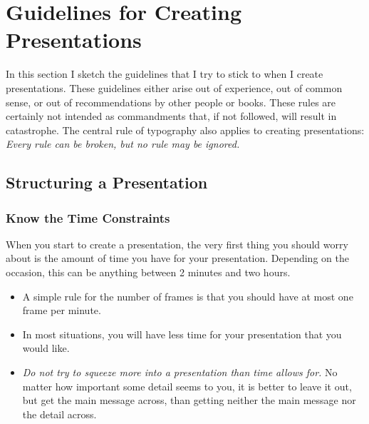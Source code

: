 
%

\section{Guidelines for Creating Presentations}


\label{section-guidelines}

In this section I sketch the guidelines that I try to stick to when I
create presentations. These guidelines either arise out of experience,
out of common sense, or out of recommendations by other people or
books. These rules are certainly not intended as commandments that, if
not followed, will result in catastrophe. The central rule of
typography also applies to creating presentations: \emph{Every rule
  can be broken, but no rule may be ignored.} 




\subsection{Structuring a Presentation}

\label{section-structure-guidelines}



\subsubsection{Know the Time Constraints}

When you start to create a presentation, the very first thing you
should worry about is the amount of time you have for your
presentation. Depending on the occasion, this can
be anything between 2 minutes and two hours.

\begin{itemize}
\item
  A simple rule for the number of frames is that you should have at
  most one frame per minute.
\item
  In most situations, you will have less time for your presentation
  that you would like.
\item
  \emph{Do not try to squeeze more into a presentation than time
  allows for.} No matter how important some detail seems to you, it is
  better to leave it out, but get the main message across, than
  getting neither the main message nor the detail across.
\end{itemize}

